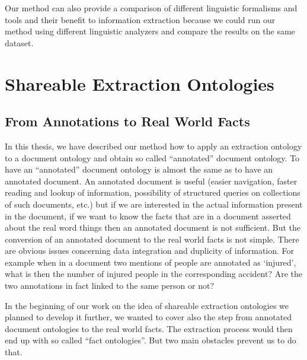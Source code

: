 Our method can also provide a comparison of different linguistic formalisms and tools and their benefit to information extraction because we could run our method using different linguistic analyzers and compare the results on the same dataset.


\section{Shareable Extraction Ontologies} 

\subsection{From Annotations to Real World Facts} \label{sec:onto_discuss}


In this thesis, we have described our method how to apply an extraction ontology to a document ontology and obtain so called ``annotated'' document ontology. To have an ``annotated'' document ontology is almost the same as to have an annotated document. An annotated document is useful (easier navigation, faster reading and lookup of information, possibility of structured queries on collections of such documents, etc.) but if we are interested in the actual information present in the document, if we want to know the facts that are in a document asserted about the real word things then an annotated document is not sufficient. But the conversion of an annotated document to the real world facts is not simple.
There are obvious issues concerning data integration and duplicity of information. For example when in a document two mentions of people are annotated as `injured', what is then the number of injured people in the corresponding accident? Are the two annotations in fact linked to the same person or not?

In the beginning of our work on the idea of shareable extraction ontologies we planned to develop it further, we wanted to cover also the step from annotated document ontologies to the real world facts. The extraction process would then end up with so called ``fact ontologies''. But two main obstacles prevent us to do that.

